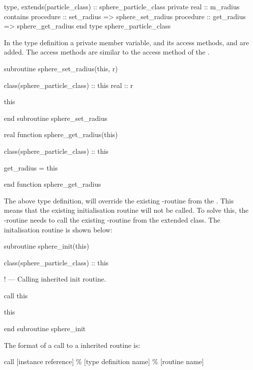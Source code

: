 \begin{fortrancodeenv}
type, extends(particle_class) :: sphere_particle_class
private
    real :: m_radius
contains
    procedure :: set_radius => sphere_set_radius
    procedure :: get_radius => sphere_get_radius
end type sphere_particle_class
\end{fortrancodeenv}

In the type definition a private member variable,  and its access methods,  and  are added. The access methods are similar to the access method of the .

\begin{fortrancodeenv}
subroutine sphere_set_radius(this, r)

    class(sphere_particle_class) :: this
    real :: r

    this %

end subroutine sphere_set_radius

real function sphere_get_radius(this)

    class(sphere_particle_class) :: this

    get_radius = this %

end function sphere_get_radius
\end{fortrancodeenv}

The above type definition, will override the existing -routine from the . This means that the existing initialisation routine will not be called. To solve this, the -routine needs to call the existing -routine from the extended class. The  initalisation routine is shown below:

\begin{fortrancodeenv}
subroutine sphere_init(this)

    class(sphere_particle_class) :: this
    
    ! --- Calling inherited init routine.

    call this %

    this %

end subroutine sphere_init
\end{fortrancodeenv}

The format of a call to a inherited routine is:

\begin{fsyntax}
call [instance reference] \% [type definition name] \% [routine name]
\end{fsyntax}

